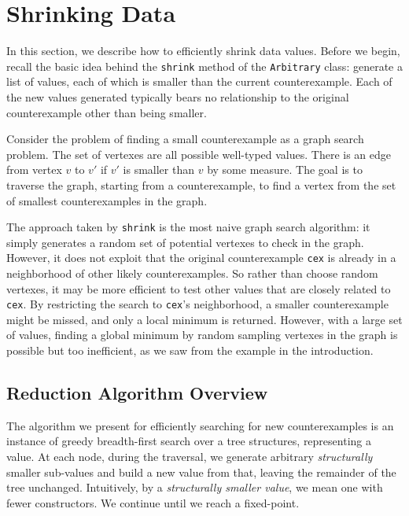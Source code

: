 \documentclass{sigplanconf}
\newcommand{\ttp}[1]{\texttt{#1}}
\begin{document}


\section{Shrinking Data}\label{sec:shrinking}
In this section, we describe how to efficiently shrink data values.  Before we
begin, recall the basic idea behind the \ttp{shrink} method of the
\ttp{Arbitrary} class: generate a list of values, each of which is smaller than
the current counterexample.  Each of the new values generated typically bears no
relationship to the original counterexample other than being smaller.

Consider the problem of finding a small counterexample as a graph search
problem.  The set of vertexes are all possible well-typed values.  There is an
edge from vertex $v$ to $v'$ if $v'$ is smaller than $v$ by some measure.  The
goal is to traverse the graph, starting from a counterexample, to find a vertex
from the set of smallest counterexamples in the graph.

The approach taken by \ttp{shrink} is the most naive graph search algorithm: it
simply generates a random set of potential vertexes to check in the graph.
However, it does not exploit that the original counterexample \ttp{cex} is
already in a neighborhood of other likely counterexamples.  So rather than
choose random vertexes, it may be more efficient to test other values that are
closely related to \ttp{cex}.  By restricting the search to \ttp{cex}'s
neighborhood, a smaller counterexample might be missed, and only a local minimum
is returned.  However, with a large set of values, finding a global minimum by
random sampling vertexes in the graph is possible but too inefficient, as we saw
from the example in the introduction.

\subsection{Reduction Algorithm Overview}\label{sec:reduct}
The algorithm we present for efficiently searching for new counterexamples is an
instance of greedy breadth-first search over a tree structures, representing a
value.  At each node, during the traversal, we generate arbitrary
\emph{structurally} smaller sub-values and build a new value from that, leaving
the remainder of the tree unchanged.  Intuitively, by a \emph{structurally
  smaller value}, we mean one with fewer constructors.  We continue until we
reach a fixed-point.
\end{document}
